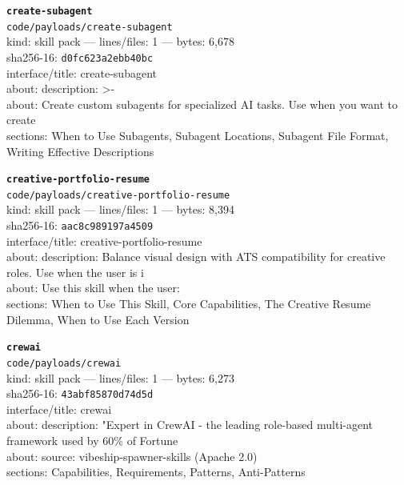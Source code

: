 \noindent\textbf{\texttt{create-subagent}}\\
\texttt{code/payloads/create-subagent}\\
kind: skill pack --- lines/files: 1 --- bytes: 6,678\\
sha256-16: \texttt{d0fc623a2ebb40bc}\\
interface/title: create-subagent\\
about: description: >-\\
about: Create custom subagents for specialized AI tasks. Use when you want to create\\
sections: When to Use Subagents, Subagent Locations, Subagent File Format, Writing Effective Descriptions\\
\vspace*{6.0pt}

\noindent\textbf{\texttt{creative-portfolio-resume}}\\
\texttt{code/payloads/creative-portfolio-resume}\\
kind: skill pack --- lines/files: 1 --- bytes: 8,394\\
sha256-16: \texttt{aac8c989197a4509}\\
interface/title: creative-portfolio-resume\\
about: description: Balance visual design with ATS compatibility for creative roles. Use when the user is i\\
about: Use this skill when the user:\\
sections: When to Use This Skill, Core Capabilities, The Creative Resume Dilemma, When to Use Each Version\\
\vspace*{6.0pt}

\noindent\textbf{\texttt{crewai}}\\
\texttt{code/payloads/crewai}\\
kind: skill pack --- lines/files: 1 --- bytes: 6,273\\
sha256-16: \texttt{43abf85870d74d5d}\\
interface/title: crewai\\
about: description: "Expert in CrewAI - the leading role-based multi-agent framework used by 60\% of Fortune\\
about: source: vibeship-spawner-skills (Apache 2.0)\\
sections: Capabilities, Requirements, Patterns, Anti-Patterns\\
\vspace*{6.0pt}

